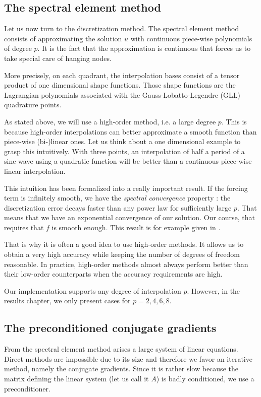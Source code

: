 \subsection*{The spectral element method}

Let us now turn to the discretization method. The spectral element method consists of approximating the solution $u$ with continuous piece-wise polynomials of degree $p$. It is the fact that the approximation is continuous that forces us to take special care of hanging nodes. 

More precisely, on each quadrant, the interpolation bases consist of a tensor product of one dimensional shape functions. Those shape functions are the Lagrangian polynomials associated with the Gauss-Lobatto-Legendre (GLL) quadrature points. 

As stated above, we will use a high-order method, i.e. a large degree $p$. This is because high-order interpolations can better approximate a smooth function than piece-wise (bi-)linear ones. Let us think about a one dimensional example to grasp this intuitively. With three points, an interpolation of half a period of a sine wave using a quadratic function will be better than a continuous piece-wise linear interpolation. 

This intuition has been formalized into a really important result. If the forcing term is infinitely smooth, we have the \textit{spectral convergence} property : the discretization error decays faster than any power law for sufficiently large $p$. That means that we have an exponential convergence of our solution. Our course, that requires that $f$  is smooth enough. This result is for example given in \cite{expConv}.

That is why it is often a good idea to use high-order methods. It allows us to obtain a very high accuracy while keeping the number of degrees of freedom reasonable. In practice, high-order methods almost always perform better than their low-order counterparts when the accuracy requirements are high.   

Our implementation supports any degree of interpolation $p$. However, in the results chapter, we only present cases for $p=2,4,6,8$. 

\subsection*{The preconditioned conjugate gradients}

From the spectral element method arises a large system of linear equations. Direct methods are impossible due to its size and therefore we favor an iterative method, namely the conjugate gradients. Since it is rather slow because the matrix defining the linear system (let us call it $A$) is badly conditioned, we use a preconditioner. 

